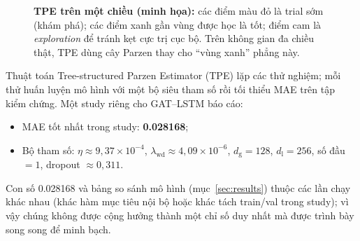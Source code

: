 \documentclass[12pt,a4paper]{article}
\begin{document}
\begin{figure}[H]
\centering
{}
\caption{\textbf{TPE trên một chiều (minh họa):} các điểm màu đỏ là trial sớm (khám phá); các điểm xanh gần vùng được học là tốt; điểm cam là \emph{exploration} để tránh kẹt cực trị cục bộ. Trên không gian đa chiều thật, TPE dùng cây Parzen thay cho ``vùng xanh'' phẳng này.}
\label{fig:optuna-1d}
\end{figure}

Thuật toán Tree-structured Parzen Estimator (TPE) lặp các thử nghiệm; mỗi thử huấn luyện mô hình với một bộ siêu tham số rồi tối thiểu MAE trên tập kiểm chứng. Một study riêng cho GAT--LSTM báo cáo:
\begin{itemize}[leftmargin=1.5em]
  \item MAE tốt nhất trong study: \textbf{0.028168};
  \item Bộ tham số: $\eta \approx 9{,}37\times 10^{-4}$, $\lambda_{\mathrm{wd}} \approx 4{,}09\times 10^{-6}$, $d_{\mathrm{g}}=128$, $d_{\mathrm{l}}=256$, số đầu $=1$, dropout $\approx 0{,}311$.
\end{itemize}
Con số 0.028168 và bảng so sánh mô hình (mục~\ref{sec:results}) thuộc các lần chạy khác nhau (khác hàm mục tiêu nội bộ hoặc khác tách train/val trong study); vì vậy chúng không được cộng hưởng thành một chỉ số duy nhất mà được trình bày song song để minh bạch.
\end{document}
